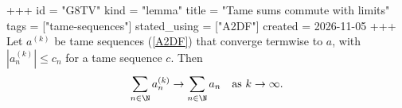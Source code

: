 +++
id = "G8TV"
kind = "lemma"
title = "Tame sums commute with limits"
tags = ["tame-sequences"]
stated_using = ["A2DF"]
created = 2026-11-05
+++
Let $a^{(k)}$ be tame sequences (\ref{A2DF}) that converge termwise to $a$, with $|a^{(k)}_n| \le c_n$ for a tame sequence $c$. Then
\[
  \sum_{n \in \N} a^{(k)}_n \to \sum_{n \in \N} a_n \quad \text{as } k \to \infty.
\]
